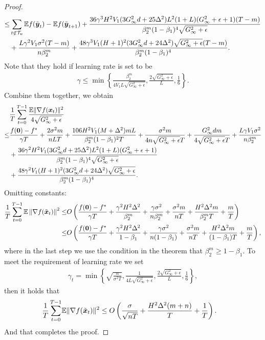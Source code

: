 \begin{proof}
\begin{align*}
    \leq & \sum_{t\not\in\mathcal{T}_{\boldsymbol{v}}}\mathbb E f(\tilde{\boldsymbol{y}}_{t}) - \mathbb Ef(\tilde{\boldsymbol{y}}_{t+1}) + \frac{36\gamma^3H^2V_1(3G_\infty^2d+25\Delta^2)L^2(1+L)(G_\infty^2+\epsilon+1)(T-m)}{\beta_2^m(1-\beta_1)^4\sqrt{G_\infty^2+\epsilon}} \\
& + \frac{L\gamma^2V_1\sigma^2(T-m)}{n\beta_2^m}  + \frac{48\gamma^3V_1(H+1)^2(3G_\infty^2d+24\Delta^2)\sqrt{G_\infty^2+\epsilon}(T-m)}{\beta_2^m(1-\beta_1)^4}.
\end{align*}
Note that they hold if learning rate is set to be
\begin{align*}
    \gamma \leq \min\left\{\frac{\beta_2^m}{4V_1L\sqrt{G_\infty^2+\epsilon}}, \frac{2\sqrt{G_\infty^2+\epsilon}}{L}, \frac{1}{6}\right\}.
\end{align*}
Combine them together, we obtain
\begin{align*}
    & \frac{1}{T}\sum_{t=0}^{T-1} \frac{\mathbb{E}\|\nabla f(\boldsymbol{x}_t)\|^2}{4\sqrt{G_\infty^2+\epsilon}} \\
\leq & \frac{f(\boldsymbol{0})-f^*}{\gamma T} + \frac{2\sigma^2m}{nLT} +  \frac{106 H^2V_1(M+\Delta^2)mL}{\beta_2^m(1-\beta_1)^2T}  + \frac{\sigma^2m}{4n\sqrt{G_\infty^2+\epsilon}T} + \frac{ G_\infty^2dm}{4\sqrt{G_\infty^2+\epsilon}T} + \frac{L\gamma V_1\sigma^2}{n\beta_2^m} \\
    & + \frac{36\gamma^2H^2V_1(3G_\infty^2d+25\Delta^2)L^2(1+L)(G_\infty^2+\epsilon+1)}{\beta_2^m(1-\beta_1)^4\sqrt{G_\infty^2+\epsilon}} \\
& + \frac{48\gamma^2V_1(H+1)^2(3G_\infty^2d+24\Delta^2)\sqrt{G_\infty^2+\epsilon}}{\beta_2^m(1-\beta_1)^4}.
\end{align*}
Omitting constants:
\begin{align*}
    \frac{1}{T}\sum_{t=0}^{T-1}\mathbb E\left\| \nabla f(\tilde{\boldsymbol{x}}_t) \right\|^2 \leq & O\left( \frac{f(\boldsymbol{0})-f^*}{\gamma T} + \frac{\gamma^2H^2\Delta^2}{\beta_2^m} + \frac{\gamma\sigma^2}{n\beta_2^m} + \frac{\sigma^2m}{nT} + \frac{H^2\Delta^2m}{\beta_2^mT} + \frac{m}{T}\right) \\
\leq & O\left( \frac{f(\boldsymbol{0})-f^*}{\gamma T} + \frac{\gamma^2H^2\Delta^2}{1-\beta_1} + \frac{\gamma\sigma^2}{n(1-\beta_1)} + \frac{\sigma^2m}{nT} + \frac{H^2\Delta^2m}{(1-\beta_1)T} + \frac{m}{T}\right),
\end{align*}
where in the last step we use the condition in the theorem that $\beta_2^m \geq 1-\beta_1$.
To meet the requirement of learning rate we set
\begin{align*}
    \gamma_t = \min\left\{ \sqrt{\frac{n}{\sigma^2T}}, \frac{1}{4L\sqrt{G_\infty^2+\epsilon}},  \frac{2\sqrt{G_\infty^2+\epsilon}}{L},  \frac{1}{6} \right\},
\end{align*}
then it holds that
\begin{align*}
    \frac{1}{T}\sum_{t=0}^{T-1} & \mathbb{E}\|\nabla f(\tilde{\boldsymbol{x}}_t)\|^2 \leq O\left( \frac{\sigma}{\sqrt{nT}} + \frac{H^2\Delta^2(m+n)}{T} +\frac{1}{T}\right).
\end{align*}
And that completes the proof.
\end{proof}

